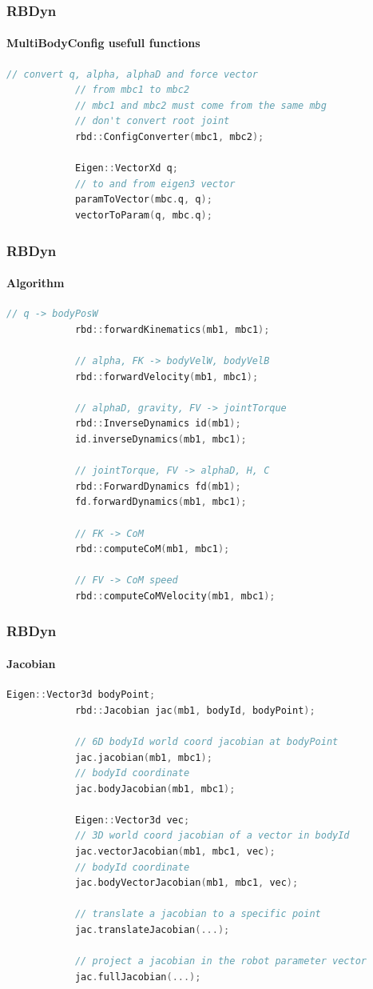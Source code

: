 \documentclass{beamer}
\begin{document}
	\begin{frame}[fragile]
		\frametitle{RBDyn}
		\framesubtitle{MultiBodyConfig usefull functions}
		\begin{lstlisting}[language=C++]
			// convert q, alpha, alphaD and force vector
			// from mbc1 to mbc2
			// mbc1 and mbc2 must come from the same mbg
			// don't convert root joint
			rbd::ConfigConverter(mbc1, mbc2);

			Eigen::VectorXd q;
			// to and from eigen3 vector
			paramToVector(mbc.q, q);
			vectorToParam(q, mbc.q);
		\end{lstlisting}
	\end{frame}

	\begin{frame}[fragile]
		\frametitle{RBDyn}
		\framesubtitle{Algorithm}
		\begin{lstlisting}[language=C++]
			// q -> bodyPosW
			rbd::forwardKinematics(mb1, mbc1);

			// alpha, FK -> bodyVelW, bodyVelB
			rbd::forwardVelocity(mb1, mbc1);

			// alphaD, gravity, FV -> jointTorque
			rbd::InverseDynamics id(mb1);
			id.inverseDynamics(mb1, mbc1);

			// jointTorque, FV -> alphaD, H, C
			rbd::ForwardDynamics fd(mb1);
			fd.forwardDynamics(mb1, mbc1);

			// FK -> CoM
			rbd::computeCoM(mb1, mbc1);

			// FV -> CoM speed
			rbd::computeCoMVelocity(mb1, mbc1);
		\end{lstlisting}
	\end{frame}

	\begin{frame}[fragile]
		\frametitle{RBDyn}
		\framesubtitle{Jacobian}
		\begin{lstlisting}[language=C++]
			Eigen::Vector3d bodyPoint;
			rbd::Jacobian jac(mb1, bodyId, bodyPoint);

			// 6D bodyId world coord jacobian at bodyPoint
			jac.jacobian(mb1, mbc1);
			// bodyId coordinate
			jac.bodyJacobian(mb1, mbc1);

			Eigen::Vector3d vec;
			// 3D world coord jacobian of a vector in bodyId
			jac.vectorJacobian(mb1, mbc1, vec);
			// bodyId coordinate
			jac.bodyVectorJacobian(mb1, mbc1, vec);

			// translate a jacobian to a specific point
			jac.translateJacobian(...);

			// project a jacobian in the robot parameter vector
			jac.fullJacobian(...);
		\end{lstlisting}
	\end{frame}
\end{document}

